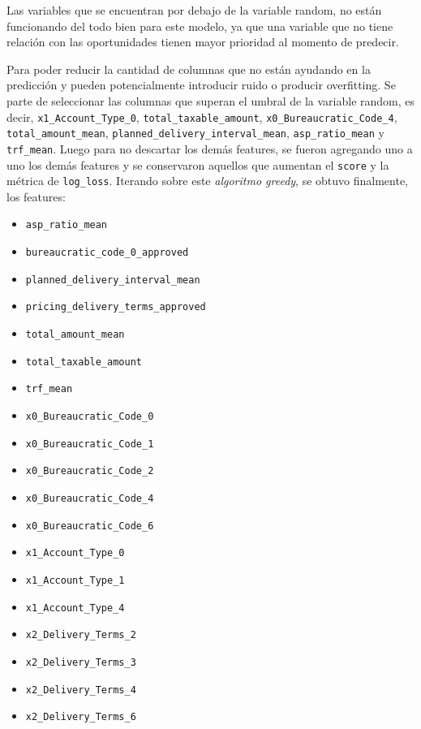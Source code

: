 \documentclass[titlepage,a4paper]{article}
\begin{document}
Las variables que se encuentran por debajo de la variable random, no están funcionando del todo bien para este modelo, ya que una variable que no tiene relación con las oportunidades tienen mayor prioridad al momento de predecir.

Para poder reducir la cantidad de columnas que no están ayudando en la predicción y pueden potencialmente introducir ruido o producir overfitting. Se parte de seleccionar las columnas que superan el umbral de la variable random, es decir, \verb|x1_Account_Type_0|, \verb|total_taxable_amount|, \verb|x0_Bureaucratic_Code_4|, \verb|total_amount_mean|, \verb|planned_delivery_interval_mean|, \verb|asp_ratio_mean| y \verb|trf_mean|. Luego para no descartar los demás features, se fueron agregando uno a uno los demás features y se conservaron aquellos que aumentan el \verb|score| y la métrica de \verb|log_loss|. Iterando sobre este \textit{algoritmo greedy}, se obtuvo finalmente, los features:

\begin{itemize}
    \item \verb|asp_ratio_mean|
    \item \verb|bureaucratic_code_0_approved|
    \item \verb|planned_delivery_interval_mean|
    \item \verb|pricing_delivery_terms_approved|
    \item \verb|total_amount_mean|
    \item \verb|total_taxable_amount|
    \item \verb|trf_mean|
    \item \verb|x0_Bureaucratic_Code_0|
    \item \verb|x0_Bureaucratic_Code_1|
    \item \verb|x0_Bureaucratic_Code_2|
    \item \verb|x0_Bureaucratic_Code_4|
    \item \verb|x0_Bureaucratic_Code_6|
    \item \verb|x1_Account_Type_0|
    \item \verb|x1_Account_Type_1|
    \item \verb|x1_Account_Type_4|
    \item \verb|x2_Delivery_Terms_2|
    \item \verb|x2_Delivery_Terms_3|
    \item \verb|x2_Delivery_Terms_4|
    \item \verb|x2_Delivery_Terms_6|
\end{itemize}
\end{document}
